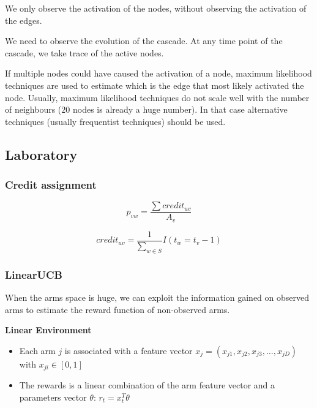\documentclass[10pt,a4paper]{article}
\begin{document}
We only observe the activation of the nodes, without observing the activation of the edges.

We need to observe the evolution of the cascade. At any time point of the cascade, we take trace of the active nodes.

If multiple nodes could have caused the activation of a node, maximum likelihood techniques are used to estimate which is the edge that most likely activated the node. Usually, maximum likelihood techniques do not scale well with the number of neighbours ($20$ nodes is already a huge number). In that case alternative techniques (usually frequentist techniques) should be used.

\subsection{Laboratory}\label{laboratory}

\subsubsection{Credit assignment}\label{credit-assignment}

$$p_{vw} = \frac{\sum{credit_{uv}}}{A_{v}}$$

$$credit_{uv} = \frac{1}{\sum_{w \in S}}{I(t_{w} = t_{v} - 1)}$$

\subsubsection{LinearUCB}\label{linearucb}

When the arms space is huge, we can exploit the information gained on observed arms to estimate the reward function of non-observed arms.
\newline

\textbf{Linear Environment}

\begin{itemize}

\item Each arm $j$ is associated with a feature vector $x_{j} = (x_{j1}, x_{j2}, x_{j3}, \ldots, x_{jD})$ with $x_{ji} \in [0,1]$
\item The rewards is a linear combination of the arm feature vector and a parameters vector $\theta$: $r_t = x_t^T \theta$
\end{itemize}
\end{document}
